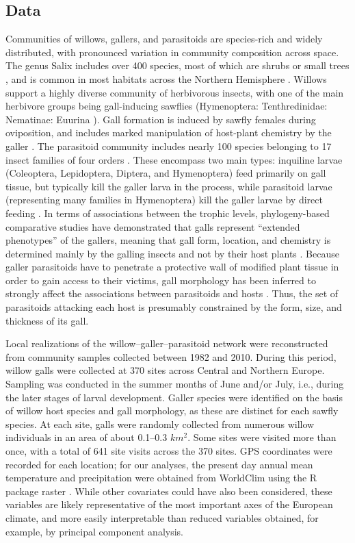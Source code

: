 \documentclass[12pt]{article}
\begin{document}
\subsection*{Data}  

Communities of willows, gallers, and parasitoids are species-rich and
widely distributed, with pronounced variation in community composition across
space. The genus Salix includes over 400 species, most of which are shrubs or
small trees \citep{Argus1997}, and is common in most habitats across the
Northern Hemisphere \citep{Skvortsov1999}. Willows support a highly diverse
community of herbivorous insects, with one of the main herbivore groups being
gall-inducing sawflies (Hymenoptera: Tenthredinidae: Nematinae: Euurina
\citep{Kopelke1999}). Gall formation is induced by sawfly females during
oviposition, and includes marked manipulation of host-plant chemistry by the
galler \citep{Nyman2000}. The parasitoid community includes nearly
100 species belonging to 17 insect families of four orders
\citep{Kopelke2000}. These encompass two main types: inquiline larvae
(Coleoptera, Lepidoptera, Diptera, and Hymenoptera) feed primarily on gall
tissue, but typically kill the galler larva in the process, while parasitoid
larvae (representing many families in Hymenoptera) kill the galler larvae by
direct feeding \citep{Kopelke2003}. In terms of associations between the
trophic levels, phylogeny-based comparative studies have demonstrated that
galls represent ``extended phenotypes'' of the gallers, meaning that gall form,
location, and chemistry is determined mainly by the galling insects and not by
their host plants \citep{Nyman2000}. Because galler parasitoids have to
penetrate a protective wall of modified plant tissue in order to gain access
to their victims, gall morphology has been inferred to strongly affect the
associations between parasitoids and hosts \citep{Nyman2007}. Thus, the set of
parasitoids attacking each host is presumably constrained by the form,
size, and thickness of its gall.

Local realizations of the willow–galler–parasitoid network were reconstructed
from community samples collected between 1982 and 2010. During this period,
willow galls were collected at 370 sites across Central and Northern Europe.
Sampling was conducted in the summer months of June and/or July, i.e., during
the later stages of larval development. Galler species were identified on the
basis of willow host species and gall morphology, as these are distinct for
each sawfly species. At each site, galls were randomly collected from numerous
willow individuals in an area of about 0.1–0.3 $km^2$. Some sites were visited
more than once, with a total of 641 site visits across the 370 sites. GPS
coordinates were recorded for each location; for our analyses, the present day
annual mean temperature and precipitation were obtained from WorldClim using
the R package raster \citep{Hijmans2015}. While other covariates could have
also been considered, these variables are likely representative of the most
important axes of the European climate, and more easily interpretable than
reduced variables obtained, for example, by principal component analysis.
\end{document}
